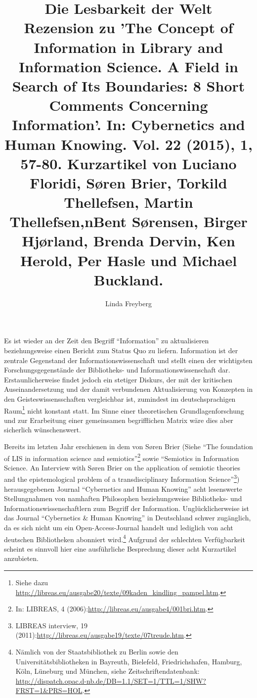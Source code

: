 \documentclass[a4paper,
fontsize=11pt,
oneside,
numbers=noperiodatend,
parskip=half-,
bibliography=totoc,
final
]{scrartcl}
\title{\LARGE{Die Lesbarkeit der Welt} \\ Rezension zu 'The Concept of Information in Library and Information Science. A Field in Search of Its Boundaries: 8 Short Comments Concerning Information'. In: Cybernetics and Human Knowing. Vol. 22 (2015), 1, 57-80. Kurzartikel von Luciano Floridi, Søren Brier, Torkild Thellefsen, Martin Thellefsen,nBent Sørensen, Birger Hjørland, Brenda Dervin, Ken Herold, Per Hasle und Michael Buckland.} %
\author{Linda Freyberg} %
\date{}
\begin{document}
\maketitle
\thispagestyle{fancyplain} 


Es ist wieder an der Zeit den Begriff \enquote{Information} zu
aktualisieren beziehungsweise einen Bericht zum Status Quo zu liefern.
Information ist der zentrale Gegenstand der Informationswissenschaft und
stellt einen der wichtigsten Forschungsgegenstände der Bibliotheks- und
Informationswissenschaft dar. Erstaunlicherweise findet jedoch ein
stetiger Diskurs, der mit der kritischen Auseinandersetzung und der
damit verbundenen Aktualisierung von Konzepten in den
Geisteswissensschaften vergleichbar ist, zumindest im deutschsprachigen
Raum\footnote{Siehe dazu
  \url{http://libreas.eu/ausgabe20/texte/09kaden_kindling_pampel.htm}.}
nicht konstant statt. Im Sinne einer theoretischen Grundlagenforschung
und zur Erarbeitung einer gemeinsamen begrifflichen Matrix wäre dies
aber sicherlich wünschenswert.

Bereits im letzten Jahr erschienen in dem von Søren Brier (Siehe
\enquote{The foundation of LIS in information science and
semiotics}\footnote{In: LIBREAS, 4
  (2006):\url{http://libreas.eu/ausgabe4/001bri.htm}.} sowie
\enquote{Semiotics in Information Science. An Interview with Søren Brier
on the application of semiotic theories and the epistemological problem
of a transdisciplinary Information Science}\footnote{LIBREAS interview,
  19 (2011):\url{http://libreas.eu/ausgabe19/texte/07treude.htm}.})
herausgegebenen Journal \enquote{Cybernetics and Human Knowing} acht
lesenswerte Stellungnahmen von namhaften Philosophen beziehungsweise
Bibliotheks- und Informationswissenschaftlern zum Begriff der
Information. Unglücklicherweise ist das Journal \enquote{Cybernetics \&
Human Knowing} in Deutschland schwer zugänglich, da es sich nicht um ein
Open-Access-Journal handelt und lediglich von acht deutschen
Bibliotheken abonniert wird.\footnote{Nämlich von der Staatsbibliothek
  zu Berlin sowie den Universitätsbibliotheken in Bayreuth, Bielefeld,
  Friedrichshafen, Hamburg, Köln, Lüneburg und München, siehe
  Zeitschriftendatenbank:
  \url{http://dispatch.opac.d-nb.de/DB=1.1/SET=1/TTL=1/SHW?FRST=1\&PRS=HOL}.}
Aufgrund der schlechten Verfügbarkeit scheint es sinnvoll hier eine
ausführliche Besprechung dieser acht Kurzartikel anzubieten.
\end{document}
